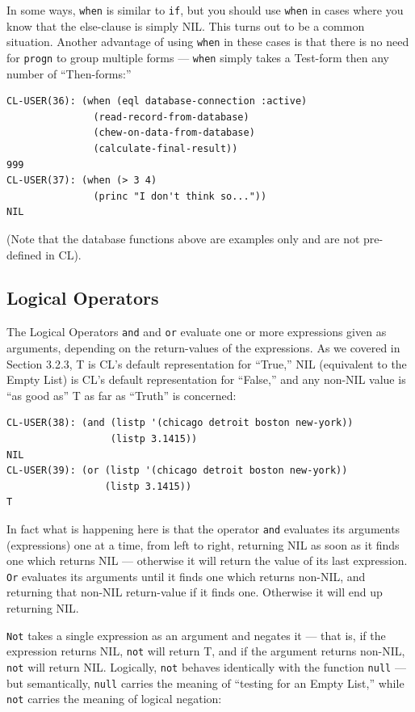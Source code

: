 In some ways, \texttt{when} is similar to \texttt{if}, but you should use \texttt{when} in cases where you know that
the else-clause is simply NIL. This turns out to be a common situation. Another advantage
of using \texttt{when} in these cases is that there is no need for \texttt{progn} to group multiple forms ---
\texttt{when} simply takes a Test-form then any number of ``Then-forms:''

\begin{verbatim}
CL-USER(36): (when (eql database-connection :active)
               (read-record-from-database)
               (chew-on-data-from-database)
               (calculate-final-result))
999
CL-USER(37): (when (> 3 4)
               (princ "I don't think so..."))
NIL
\end{verbatim}

(Note that the database functions above are examples only and are not pre-defined in CL).

\subsection{Logical Operators}

The Logical Operators \texttt{and} and \texttt{or} evaluate one or more expressions given as arguments,
depending on the return-values of the expressions. As we covered in Section 3.2.3, T is
CL's default representation for ``True,'' NIL (equivalent to the Empty List) is CL's default
representation for ``False,'' and any non-NIL value is ``as good as'' T as far as ``Truth'' is
concerned:

\begin{verbatim}
CL-USER(38): (and (listp '(chicago detroit boston new-york))
                  (listp 3.1415))
NIL
CL-USER(39): (or (listp '(chicago detroit boston new-york))
                 (listp 3.1415))
T
\end{verbatim}

In fact what is happening here is that the operator \texttt{and} evaluates its arguments (expressions)
one at a time, from left to right, returning NIL as soon as it finds one which returns NIL ---
otherwise it will return the value of its last expression. \texttt{Or} evaluates its arguments until it
finds one which returns non-NIL, and returning that non-NIL return-value if it finds one.
Otherwise it will end up returning NIL.

\texttt{Not} takes a single expression as an argument and negates it --- that is, if the expression returns NIL, \texttt{not} will return T, and if the argument returns non-NIL, \texttt{not} will return
NIL. Logically, \texttt{not} behaves identically with the function \texttt{null} --- but semantically, \texttt{null}
carries the meaning of ``testing for an Empty List,'' while \texttt{not} carries the meaning of logical
negation:

